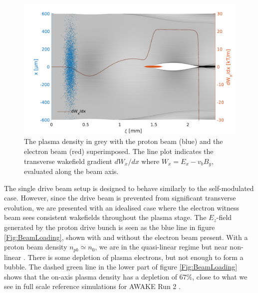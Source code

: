 \documentclass[aps,prstab,reprint,amsmath,amssymb,groupedaddress]{revtex4-1}
\begin{document}
\begin{figure}[hbt]
    \includegraphics[width=\linewidth,trim={2mm 0mm 2mm 0mm},clip]{figures/plasmaDenTWake}
    \caption{\label{Fig:PlasmaDenTWake} The plasma density in grey with the proton beam (blue) and the electron beam
        (red) superimposed. The line plot indicates the transverse wakefield gradient $dW_{x}/dx$ where
        $W_{x} = E_{x} - v_{b} B_{y}$, evaluated along the beam axis.}
\end{figure}


The single drive beam setup is designed to behave similarly to the self-modulated case. However, since the drive beam is
prevented from significant transverse evolution, we are presented with an idealised case where the electron witness beam
sees consistent wakefields throughout the plasma stage. The $E_{z}$-field generated by the proton drive bunch is seen as
the blue line in figure \ref{Fig:BeamLoading}, shown with and without the electron beam present. With a proton beam
density $n_{pb} \simeq n_{0}$, we are in the quasi-linear regime but near non-linear \cite{rosenzweig:2010}. There is
some depletion of plasma electrons, but not enough to form a bubble. The dashed green line in the lower part of figure
\ref{Fig:BeamLoading} shows that the on-axis plasma density has a depletion of $67\%$, close to what we see in full
scale reference simulations for AWAKE Run 2 \cite{awake_collaboration:2016}.

\end{document}
